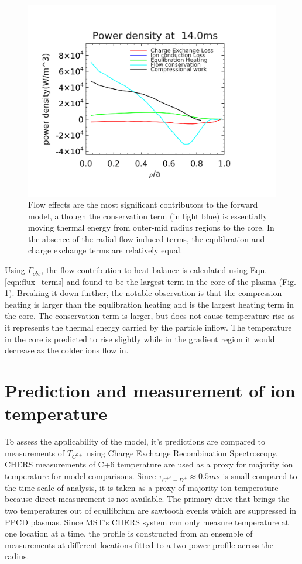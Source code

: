 \documentclass[aip, pop, preprint]{revtex4-1}
\begin{document}
\begin{figure}
	\centering
	\includegraphics[width=1.\columnwidth]{./plots/dedt_june18-1.png}
	\caption{Flow effects are the most significant contributors to the forward model, although the conservation term (in light blue) is essentially moving thermal energy from outer-mid radius regions to the core. In the absence of the radial flow induced terms, the equlibration and charge exchange terms are relatively equal. \label{fig:dedt_plot}}
\end{figure}

Using $\Gamma_{obs}$, the flow
contribution to heat balance is calculated using Eqn. \ref{eqn:flux_terms} and found to be the largest term in
the core of the plasma (Fig. \ref{fig:dedt_plot}). Breaking it down further, the notable observation is
that the compression heating is larger than the equlibration heating and is the
largest heating term in the core. The conservation term is larger, but does not
cause temperature rise as it represents the thermal energy carried by the particle inflow. The temperature in the core is predicted to rise slightly
while in the gradient region it would decrease as the colder ions flow in.

\section{Prediction and measurement of ion temperature}


To assess the applicability of the model, it's predictions are compared to
measurements of $T_{C^{6+}}$ using Charge Exchange Recombination
Spectroscopy\cite{DenHartog1994,DenHartog2006Advancesinvited}. CHERS
measurements of C+6 temperature are used as a proxy for majority ion temperature
for model comparisons. Since $\tau_{C^{+6}-D^{+}} \approx 0.5ms$ is small compared to the time
scale of analysis, it is taken as a proxy of majority ion temperature because direct
measurement is not available\cite{Reardon2003}. The primary drive that brings
the two temperatures out of equilibrium are sawtooth events which are
suppressed in PPCD plasmas\cite{Fiksel2009}. Since MST's CHERS system can only
measure temperature at one location at a time, the profile is constructed from
an ensemble of measurements at different locations fitted to a two power
profile across the radius.
\end{document}
